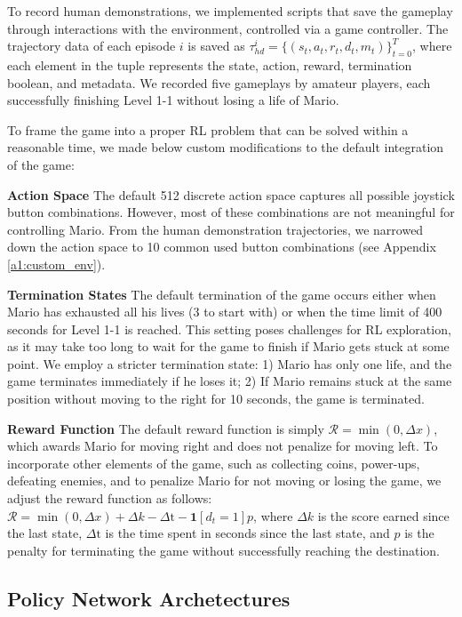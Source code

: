 \documentclass{article}
\begin{document}
To record human demonstrations, we implemented scripts that save the gameplay 
through interactions with the environment, controlled via a game controller. 
The trajectory data of each episode $i$ is saved as $\tau_{hd}^{i} = \{(s_t, a_t, 
r_t, d_t, m_t)\}_{t=0}^{T}$, where each element in the tuple represents the 
state, action, reward, termination boolean, and metadata. We recorded five 
gameplays by amateur players, each successfully finishing Level 1-1 without 
losing a life of Mario.

To frame the game into a proper RL problem that can be solved within a
reasonable time, we made below custom modifications to the default integration
of the game:

\textbf{Action Space} 
The default 512 discrete action space captures all possible joystick button 
combinations. However, most of these combinations are not meaningful for 
controlling Mario. From the human demonstration trajectories, we narrowed down 
the action space to 10 common used button combinations (see 
Appendix \ref{a1:custom_env}).

\textbf{Termination States}
The default termination of the game occurs either when Mario has exhausted all 
his lives (3 to start with) or when the time limit of 400 seconds for Level 1-1 is reached. This 
setting poses challenges for RL exploration, as it may take too long to wait 
for the game to finish if Mario gets stuck at some point. We employ a stricter 
termination state: 1) Mario has only one life, and the game terminates 
immediately if he loses it; 2) If Mario remains stuck at the same position 
without moving to the right for 10 seconds, the game is terminated.

\textbf{Reward Function}
The default reward function is simply $\mathcal{R} = \min(0,\Delta x)$, which 
awards Mario for moving right and does not penalize for moving left. To 
incorporate other elements of the game, such as collecting coins, power-ups, 
defeating enemies, and to penalize Mario for not moving or losing the game, we 
adjust the reward function as follows: 
$\mathcal{R} = \min(0,\Delta x) + \Delta k - \Delta \text{t} - \mathbf{1}[d_t = 1] p$, 
where $\Delta k$ is the score earned since the last state, $\Delta \text{t}$ is 
the time spent in seconds since the last state, and $p$ is the penalty for 
terminating the game without successfully reaching the destination.


\subsection{Policy Network Archetectures}
\end{document}
